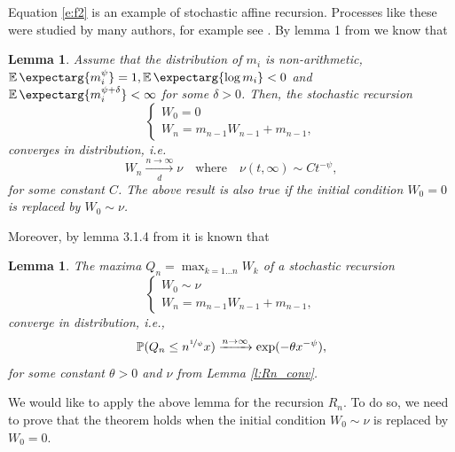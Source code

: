 \documentclass[12pt]{article}
\newcommand{\Pro}{\mathbb{P}}
\newcommand{\converges}{\xrightarrow{n \rightarrow \infty}}
\newtheorem{lemma}[theorem]{Lemma}
\newcommand{\expect}{\operatorname{\mathbb{E}}\expectarg}
\begin{document}
Equation \eqref{e:f2} is an example of stochastic affine recursion. Processes like these were studied by many authors, for example see \cite{KESTEN_REC}. By lemma 1 from \cite{KKS} we know that 
\begin{lemma}\label{l:Rn_conv}
    Assume that the distribution of $m_i$ is non-arithmetic, $\expect{m_i^\psi} = 1, \expect{\log m_i} < 0 $ and  $\expect{m_i^{\psi + \delta}} < \infty $ for some $\delta > 0$.
    Then, the stochastic recursion 
    \begin{equation*}\label{e:recursion}
        \begin{cases}
            W_0 = 0 \\
            W_n = m_{n-1}W_{n-1} + m_{n-1},
        \end{cases}
    \end{equation*}
    converges in distribution, i.e.
    \begin{equation} 
        W_n \xrightarrow[d]{n\rightarrow \infty} \nu \quad \text{where} \quad  \nu(t, \infty) \sim C t^{-\psi},
    \end{equation}
    for some constant $C$. The above result is also true if the initial condition $W_0 = 0$ is replaced by $W_0 \sim \nu$.
\end{lemma}
Moreover, by lemma 3.1.4 from \cite{DBURA1} it is known that
\begin{lemma} \label{l:Q_n}
    The maxima $ Q_n = \max_{k=1 \dots n}W_k$ of a stochastic recursion 
    \begin{equation*}\label{e:recursion2}
        \begin{cases}
            W_0 \sim \nu \\
            W_n = m_{n-1}W_{n-1} + m_{n-1},
        \end{cases}
    \end{equation*}
    converge in distribution, i.e., 
    \begin{equation} \label{e:M_thilda_conv}
        \Pro(Q_n \leq n^{\nicefrac{1}{\psi}} x ) \converges \exp(-\theta x^{-\psi}),
    \end{equation}
    for some constant $\theta > 0$ and $\nu$ from Lemma \eqref{l:Rn_conv}.
\end{lemma}

We would like to apply the above lemma for the recursion $R_n$. To do so, we need to prove that the theorem holds when the initial condition $W_0 \sim \nu$ is replaced by $W_0 = 0.$
\end{document}
